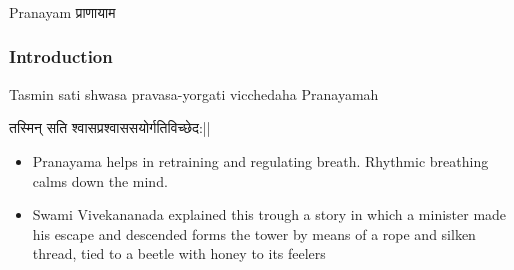 \begin{frame}[fragile]\frametitle{}
\begin{center}
{\Large Pranayam प्राणायाम}
\end{center}
\end{frame}

\begin{frame}[fragile]\frametitle{Introduction}

Tasmin sati shwasa pravasa-yorgati vicchedaha Pranayamah

तस्मिन् सति श्वासप्रश्वाससयोर्गतिविच्छेद:||

	\begin{itemize}
	\item Pranayama  helps  in  retraining 
and  regulating  breath. 
Rhythmic  breathing  calms 
down  the  mind.  
	\item Swami 
Vivekananada  explained  this 
trough  a  story  in  which  a 
minister  made  his  escape  and 
descended forms the tower by 
means  of  a  rope  and  silken 
thread,  tied  to  a  beetle  with 
honey to its feelers 
	\end{itemize}

\end{frame}
